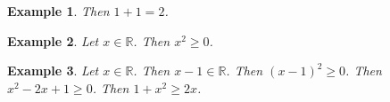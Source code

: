 \documentclass[12pt]{article}
\newtheorem{example}{Example}
\begin{document}
\begin{example}
    Then $1+1=2$.
\end{example}

\begin{example}
    Let $x\in\mathbb{R}$. Then $x^2\geq 0$.
\end{example}

\begin{example}
    Let $x\in\mathbb{R}$. Then $x - 1 \in \mathbb{R}$. Then $(x-1)^2 \geq 0$. Then $x^2 - 2x + 1 \geq 0$. Then $1 + x^2 \geq 2x$.
\end{example}
\end{document}
